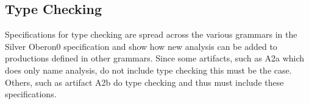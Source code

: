 \begin{comment}
\paragraph{OLD}
env on a node contains the list of scopes
a list of scopes

The environment is represented by the \texttt{env} inherited
 \footnote{Actually it is an 'autocopy' attribute, this is simply an inherited attribute
 that implicitly copies from parent to child if no other definition is present.}
attribute.
%
%
The \texttt{Env} type is simply a container for the separate namespaces of the
environment.
%
Each names space (e.g. the \texttt{values} attribute on \texttt{Env}) has the
type \texttt{[TreeMap<String  Decorated Decl>]}.
%
The list represents \textit{scopes}, while the map allows looking up bound
names.

This representation is actually ``over powered" for Oberon0's needs.
%
Ober-on0 does not have separate namespaces for values and types, so our
separation of them in the environment is actually unnecessary, and in fact
adds a small complication to redeclaration checks: they must consult both
namespaces.
%
However, it is a nice demonstration of how a more interesting environment
would be set up.

%

\end{comment}


\subsection{Type Checking}\label{}

Specifications for type checking are spread across the various
grammars in the Silver Oberon0 specification and show how new analysis
can be added to productions defined in other grammars.  Since some
artifacts, such as A2a which does only name analysis, do not include
type checking this must be the case.  Others, such as artifact A2b do
type checking and thus must include these specifications.

